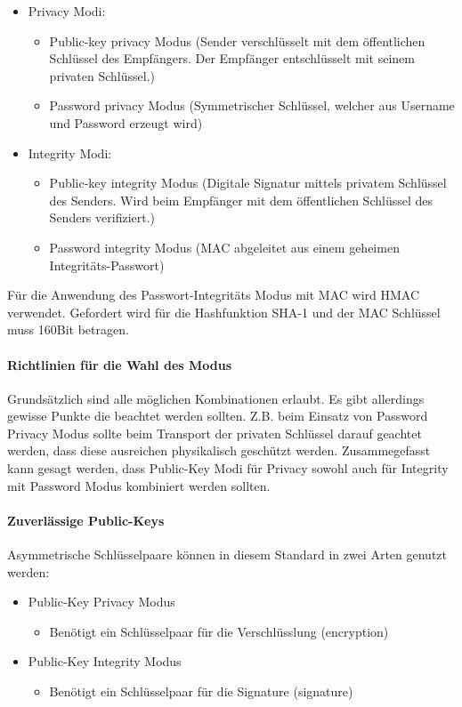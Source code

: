 \documentclass[10pt,a4paper]{article}
\begin{document}
\begin{itemize}
    \item Privacy Modi:
        \begin{itemize}
            \item Public-key privacy Modus (Sender verschlüsselt mit dem öffentlichen
                Schlüssel des Empfängers. Der Empfänger entschlüsselt mit seinem privaten
                Schlüssel.)
            \item Password privacy Modus (Symmetrischer Schlüssel, welcher aus Username
                und Password erzeugt wird)
        \end{itemize}
    \item Integrity Modi:
        \begin{itemize}
            \item Public-key integrity Modus (Digitale Signatur mittels privatem Schlüssel
                des Senders. Wird beim Empfänger mit dem öffentlichen Schlüssel des
                Senders verifiziert.)
            \item Password integrity Modus (MAC abgeleitet aus einem geheimen
                Integritäts-Passwort)
        \end{itemize}
\end{itemize}

Für die Anwendung des Passwort-Integritäts Modus mit MAC wird HMAC verwendet. Gefordert
wird für die Hashfunktion SHA-1 und der MAC Schlüssel muss 160Bit betragen.

\paragraph{Richtlinien für die Wahl des Modus}
Grundsätzlich sind alle möglichen Kombinationen erlaubt. Es gibt allerdings gewisse Punkte
die beachtet werden sollten. Z.B. beim Einsatz von Password Privacy Modus sollte beim
Transport der privaten Schlüssel darauf geachtet werden, dass diese ausreichen
physikalisch geschützt werden. Zusammegefasst kann gesagt werden, dass Public-Key Modi für
Privacy sowohl auch für Integrity mit Password Modus kombiniert werden sollten.

\paragraph{Zuverlässige Public-Keys}
Asymmetrische Schlüsselpaare können in diesem Standard in zwei Arten genutzt werden:

\begin{itemize}
    \item Public-Key Privacy Modus
        \begin{itemize}
            \item Benötigt ein Schlüsselpaar für die Verschlüsslung (encryption)
        \end{itemize}
    \item Public-Key Integrity Modus
        \begin{itemize}
            \item Benötigt ein Schlüsselpaar für die Signature (signature)
        \end{itemize}
\end{itemize}
\end{document}

